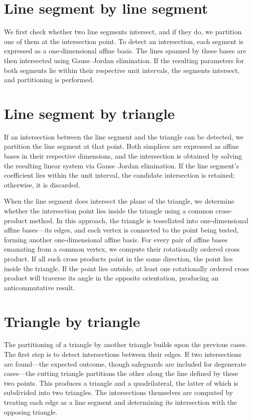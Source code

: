 \section{Line segment by line segment}

We first check whether two line segments intersect, and if they do, 
we partition one of them at the intersection point. To detect an 
intersection, each segment is expressed as a one-dimensional affine 
basis. The lines spanned by these bases are then intersected using 
Gauss--Jordan elimination. If the resulting parameters for both 
segments lie within their respective unit intervals, the segments 
intersect, and partitioning is performed.

\section{Line segment by triangle}

If an intersection between the line segment and the triangle can be 
detected, we partition the line segment at that point. Both simplices 
are expressed as affine bases in their respective dimensions, and the 
intersection is obtained by solving the resulting linear system via 
Gauss--Jordan elimination. If the line segment's coefficient lies 
within the unit interval, the candidate intersection is retained; 
otherwise, it is discarded. 

When the line segment does intersect the plane of the triangle, we 
determine whether the intersection point lies inside the triangle 
using a common cross-product method. In this approach, the 
triangle is tessellated into one-dimensional affine bases---its 
edges, and each vertex is connected to the point being tested, forming 
another one-dimensional affine basis. For every pair of affine bases 
emanating from a common vertex, we compute their rotationally ordered 
cross product. If all such cross products point in the same direction, 
the point lies inside the triangle. If the point lies outside, at 
least one rotationally ordered cross product will traverse its angle 
in the opposite orientation, producing an anticommutative result.

\section{Triangle by triangle}

The partitioning of a triangle by another triangle builds upon the 
previous cases. The first step is to detect intersections between 
their edges. If two intersections are found---the expected outcome, 
though safeguards are included for degenerate cases---the cutting 
triangle partitions the other along the line defined by these two 
points. This produces a triangle and a quadrilateral, the latter of 
which is subdivided into two triangles. The intersections themselves 
are computed by treating each edge as a line segment and determining 
its intersection with the opposing triangle.
